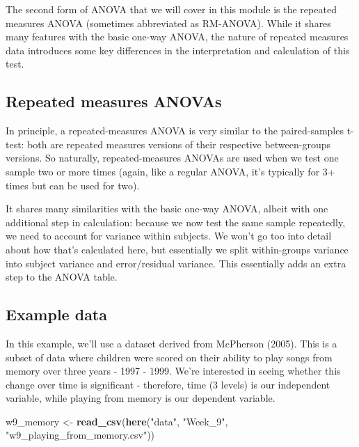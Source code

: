 \documentclass[
]{book}
\newenvironment{Shaded}{\begin{snugshade}}{\end{snugshade}}
\newcommand{\FunctionTok}[1]{\textcolor[rgb]{0.13,0.29,0.53}{\textbf{#1}}}
\newcommand{\NormalTok}[1]{#1}
\newcommand{\OtherTok}[1]{\textcolor[rgb]{0.56,0.35,0.01}{#1}}
\newcommand{\StringTok}[1]{\textcolor[rgb]{0.31,0.60,0.02}{#1}}
\begin{document}
The second form of ANOVA that we will cover in this module is the repeated measures ANOVA (sometimes abbreviated as RM-ANOVA). While it shares many features with the basic one-way ANOVA, the nature of repeated measures data introduces some key differences in the interpretation and calculation of this test.

\hypertarget{repeated-measures-anovas}{%
\subsection{Repeated measures ANOVAs}\label{repeated-measures-anovas}}

In principle, a repeated-measures ANOVA is very similar to the paired-samples t-test: both are repeated measures versions of their respective between-groups versions. So naturally, repeated-measures ANOVAs are used when we test one sample two or more times (again, like a
regular ANOVA, it's typically for 3+ times but can be used for two).

It shares many similarities with the basic one-way ANOVA, albeit with one additional step in calculation: because we now test the same sample repeatedly, we need to account for variance within subjects. We won't go too into detail about how that's calculated here, but essentially we split within-groups variance into subject variance and error/residual variance. This essentially adds an extra step to the ANOVA table.

\hypertarget{example-data-4}{%
\subsection{Example data}\label{example-data-4}}

In this example, we'll use a dataset derived from McPherson (2005). This is a subset of data where children were scored on their ability to play songs from memory over three years - 1997 - 1999. We're interested in seeing whether this change over time is significant - therefore, time (3 levels) is our independent variable, while playing from memory is our dependent variable.

\begin{Shaded}
\begin{Highlighting}[]
\NormalTok{w9\_memory }\OtherTok{\textless{}{-}} \FunctionTok{read\_csv}\NormalTok{(}\FunctionTok{here}\NormalTok{(}\StringTok{"data"}\NormalTok{, }\StringTok{"Week\_9"}\NormalTok{, }\StringTok{"w9\_playing\_from\_memory.csv"}\NormalTok{))}
\end{Highlighting}
\end{Shaded}
\end{document}
